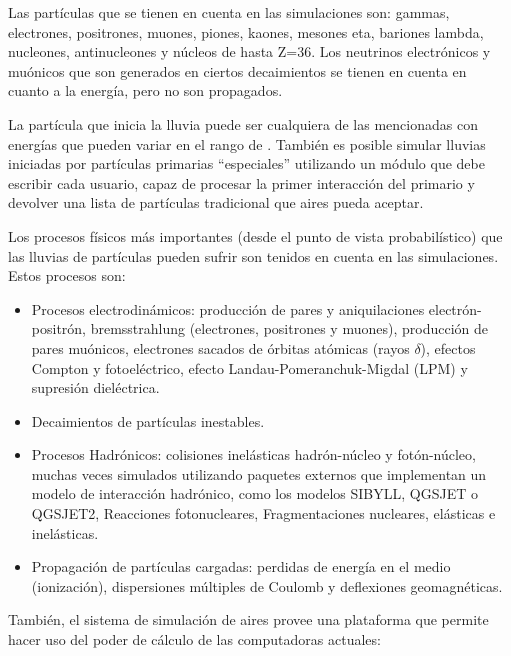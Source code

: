 	Las partículas que se tienen en cuenta en las simulaciones son: gammas, electrones, positrones, muones, piones, kaones, mesones eta, bariones lambda, nucleones, antinucleones y núcleos de hasta Z=36.
	Los neutrinos electr\'onicos y mu\'onicos que son generados en ciertos decaimientos se tienen en cuenta en cuanto a la energía, pero no son propagados.
	
	La part\'icula que inicia la lluvia puede ser cualquiera de las mencionadas con energías que pueden variar en el rango de . 
	Tambi\'en es posible simular lluvias iniciadas por partículas primarias ``especiales'' utilizando un módulo que debe escribir cada usuario, capaz de procesar la primer interacción del primario y devolver una lista de part\'iculas tradicional que {\sc aires} pueda aceptar. 

	Los procesos físicos m\'as importantes (desde el punto de vista probabilístico) que las lluvias de part\'iculas pueden sufrir son tenidos en cuenta en las simulaciones. 
	Estos procesos son:

	\begin{itemize}
	\item Procesos electrodin\'amicos: producci\'on de pares y aniquilaciones electr\'on-positr\'on, bremsstrahlung (electrones, positrones y muones), producci\'on de pares mu\'onicos, electrones sacados de \'orbitas at\'omicas (rayos $\delta$), efectos Compton y fotoel\'ectrico, efecto Landau-Pomeranchuk-Migdal (LPM) y supresi\'on diel\'ectrica.
	\item Decaimientos de part\'iculas inestables.
	\item Procesos Hadr\'onicos: colisiones inel\'asticas hadr\'on-n\'ucleo y fot\'on-n\'ucleo, muchas veces simulados utilizando paquetes externos que implementan un modelo de interacci\'on hadr\'onico, como los modelos SIBYLL, QGSJET o QGSJET2, Reacciones fotonucleares, Fragmentaciones nucleares, elásticas e inelásticas.
	\item Propagaci\'on de part\'iculas cargadas: perdidas de energ\'ia en el medio (ionizaci\'on), dispersiones múltiples de Coulomb y deflexiones geomagn\'eticas.
	\end{itemize}    

	Tambi\'en, el sistema de simulación de {\sc aires} provee una plataforma que permite hacer uso del poder de c\'alculo de las computadoras actuales:
	
